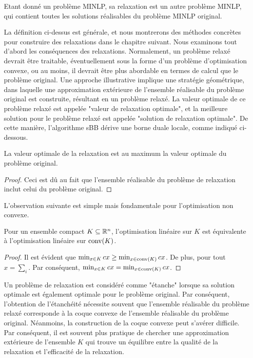   \begin{definition}
    Etant donné un problème MINLP, sa relaxation est un autre problème MINLP, qui contient toutes les solutions réalisables du problème MINLP original.
  \end{definition}
  
  La définition ci-dessus est générale, et nous montrerons des méthodes concrètes pour construire des relaxations dans le chapitre suivant. Nous examinons tout d'abord les conséquences des relaxations.
  Normalement, un problème relaxé devrait être traitable, éventuellement sous la forme d'un problème d'optimisation convexe, ou au moins, il devrait être plus abordable en termes de calcul que le problème original. Une approche illustrative implique une stratégie géométrique, dans laquelle une approximation extérieure de l'ensemble réalisable du problème original est construite, résultant en un problème relaxé. La valeur optimale de ce problème relaxé est appelée "valeur de relaxation optimale", et la meilleure solution pour le problème relaxé est appelée "solution de relaxation optimale". De cette manière, l'algorithme sBB dérive une borne duale locale, comme indiqué ci-dessous.

  \begin{lemma}
    La valeur optimale de la relaxation est au maximum la valeur optimale du problème original.
\end{lemma}
\begin{proof}
    Ceci est dû au fait que l'ensemble réalisable du problème de relaxation inclut celui du problème original.
\end{proof}


 L'observation suivante est simple mais fondamentale pour l'optimisation non convexe.

\begin{lemma}
\label{lem.compacthull_}
    Pour un ensemble compact $K \subseteq \mathbb R^n$, l'optimisation linéaire sur $K$ est équivalente à l'optimisation linéaire sur $\operatorname{conv}(K)$.
\end{lemma}
\begin{proof}
    Il est évident que $\min_{x \in K} c x \ge \min_{x \in \operatorname{conv}(K)} c x$. De plus, pour tout $x = \sum_{i}$.  Par conséquent, $\min_{x \in K} c x = \min_{x \in \operatorname{conv}(K)} c x$. 
\end{proof}


Un problème de relaxation est considéré comme "étanche" lorsque sa solution optimale est également optimale pour le problème original. Par conséquent, l'obtention de l'étanchéité nécessite souvent que l'ensemble réalisable du problème relaxé corresponde à la coque convexe de l'ensemble réalisable du problème original. Néanmoins, la construction de la coque convexe peut s'avérer difficile. Par conséquent, il est souvent plus pratique de chercher une approximation extérieure de l'ensemble $K$ qui trouve un équilibre entre la qualité de la relaxation et l'efficacité de la relaxation.


